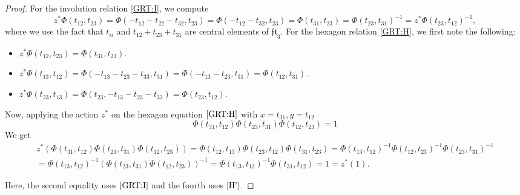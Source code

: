 \documentclass{amsart}
\newcommand{\fft}{\mathfrak{ft}}
\theoremstyle{definition}
\numberwithin{equation}{section}
\begin{document}
\begin{proof}
For the involution relation \eqref{GRT:I}, we compute \[z^* \Phi(t_{12},t_{23}) = \Phi(-t_{12}-t_{22}-t_{32},t_{23}) = \Phi(-t_{12}-t_{32},t_{23}) = \Phi(t_{31},t_{23}) = \Phi(t_{23},t_{31})^{-1} = z^*\Phi(t_{23},t_{12})^{-1},\]
where we use the fact that $t_{ii}$ and $t_{12}+t_{23}+t_{31}$ are central elements of $\fft_3$. For the hexagon relation \eqref{GRT:H}, we first note the following: 
\begin{itemize}
    \item $z^* \Phi(t_{12},t_{23}) = \Phi(t_{31},t_{23})$.
    \item $z^*\Phi(t_{13},t_{12}) = \Phi(-t_{13}-t_{23}-t_{33}, t_{31}) = \Phi(-t_{13}-t_{23}, t_{31}) = \Phi(t_{12}, t_{31})$.
    \item $z^* \Phi(t_{23},t_{13}) = \Phi(t_{23},-t_{13}-t_{23}-t_{33}) = \Phi(t_{23}, t_{12})$.
\end{itemize}
Now, applying the action $z^*$ on the hexagon equation $\eqref{GRT:H}$ with $x = t_{31}, y = t_{12}$ 
    \begin{equation} \label{H'}
        \Phi(t_{31}, t_{12}) \Phi(t_{23}, t_{31}) \Phi(t_{12}, t_{23}) = 1
    \end{equation}
We get
    \begin{equation*}
        \begin{aligned}
	z^* \left( \Phi(t_{31}, t_{12}) \Phi(t_{23}, t_{31}) \Phi(t_{12}, t_{23})\right) = \Phi(t_{12}, t_{13}) \Phi(t_{23}, t_{12}) \Phi(t_{31}, t_{23})
	 = \Phi(t_{13}, t_{12})^{-1} \Phi(t_{12}, t_{23})^{-1} \Phi(t_{23}, t_{31})^{-1} \\
	 = \Phi(t_{13}, t_{12})^{-1} \left(\Phi(t_{23}, t_{31})  \Phi(t_{12}, t_{23})\right)^{-1}
     =  \Phi(t_{13}, t_{12})^{-1} \Phi(t_{31},t_{12})
      =  1 =  z^*(1).
    \end{aligned}
    \end{equation*}

Here, the second equality uses $\eqref{GRT:I}$ and the fourth uses $\eqref{H'}$.
\end{proof}
\end{document}
